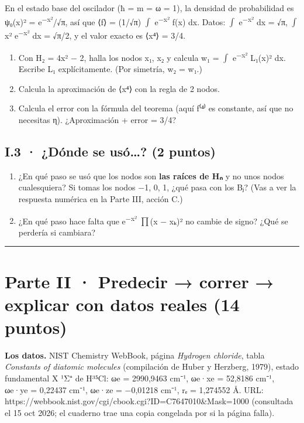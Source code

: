 En el estado base del oscilador (ħ = m = ω = 1), la densidad de probabilidad es \textbar ψ₀(x)\textbar² = e\textsuperscript{−x²}/√π, así que ⟨f⟩ = (1/√π) \ensuremath{\int} e\textsuperscript{−x²} f(x) dx. Datos: \ensuremath{\int} e\textsuperscript{−x²} dx = √π, \ensuremath{\int} x² e\textsuperscript{−x²} dx = √π/2, y el valor exacto es ⟨x⁴⟩ = 3/4.

\begin{enumerate}
\def\labelenumi{\alph{enumi})}
\item
  Con H₂ = 4x² − 2, halla los nodos x₁, x₂ y calcula w₁ = \ensuremath{\int} e\textsuperscript{−x²} L₁(x)² dx. Escribe L₁ explícitamente. (Por simetría, w₂ = w₁.)
\item
  Calcula la aproximación de ⟨x⁴⟩ con la regla de 2 nodos.
\item
  Calcula el error con la fórmula del teorema (aquí f⁽⁴⁾ es constante, así que no necesitas η). ¿Aproximación + error = 3/4?
\end{enumerate}

\subsection{I.3 · ¿Dónde se usó\ldots? (2 puntos)}

\begin{enumerate}
\def\labelenumi{\alph{enumi})}
\item
  ¿En qué paso se usó que los nodos son \textbf{las raíces de Hₙ} y no unos nodos cualesquiera? Si tomas los nodos −1, 0, 1, ¿qué pasa con los Bⱼ? (Vas a ver la respuesta numérica en la Parte III, acción C.)
\item
  ¿En qué paso hace falta que e\textsuperscript{−x²} \ensuremath{\prod}(x − xₖ)² no cambie de signo? ¿Qué se perdería si cambiara?
\end{enumerate}

\begin{center}\rule{0.5\linewidth}{0.5pt}\end{center}

\section{Parte II · Predecir → correr → explicar con datos reales (14 puntos)}

\textbf{Los datos.} NIST Chemistry WebBook, página \emph{Hydrogen chloride}, tabla \emph{Constants of diatomic molecules} (compilación de Huber y Herzberg, 1979), estado fundamental X ¹Σ⁺ de H³⁵Cl: ωe = 2990,9463 cm⁻¹, ωe·xe = 52,8186 cm⁻¹, ωe·ye = 0,22437 cm⁻¹, ωe·ze = −0,01218 cm⁻¹, rₑ = 1,274552 Å. URL: https://webbook.nist.gov/cgi/cbook.cgi?ID=C7647010\&Mask=1000 (consultada el 15 oct 2026; el cuaderno trae una copia congelada por si la página falla).

